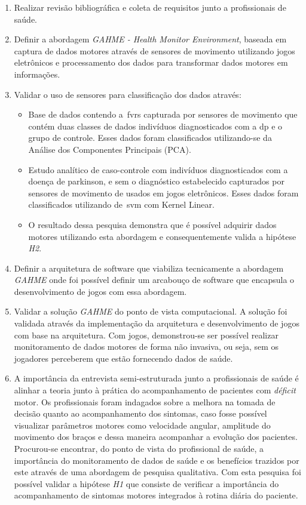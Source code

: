 \begin{enumerate}

\item{Realizar revisão bibliográfica e coleta de requisitos junto a profissionais de saúde.}

\item{Definir a abordagem \textit{GAHME - Health Monitor Environment}, baseada em captura de dados motores através de sensores de movimento utilizando jogos eletrônicos e processamento dos dados para transformar dados motores em informações.}

\item{Validar o uso de sensores para classificação dos dados através:} 
	\begin{itemize}
		\item Base de dados contendo a~\ac{fvrs} capturada por sensores de movimento que contém duas classes de dados indivíduos diagnosticados com a \ac{dp} e o grupo de controle. Esses dados foram classificados utilizando-se da Análise dos Componentes Principais (PCA).
		\item Estudo analítico de caso-controle com indivíduos diagnosticados com a doença de parkinson, e sem o diagnóstico estabelecido capturados por sensores de movimento de usados em jogos eletrônicos. Esses dados foram classificados utilizando de~\ac{svm} com Kernel Linear.
		\item O resultado dessa pesquisa demonstra que é possível adquirir dados motores utilizando esta abordagem e consequentemente valida a hipótese \textit{H2}.
	\end{itemize}
\item{Definir a arquitetura de software que viabiliza tecnicamente a abordagem \textit{GAHME} onde foi possível definir um arcabouço de software que encapsula o desenvolvimento de jogos com essa abordagem.}

\item{Validar a solução \textit{GAHME} do ponto de vista computacional. A solução foi validada através da implementação da arquitetura e desenvolvimento de jogos com base na arquitetura. Com jogos, demonstrou-se ser possível realizar monitoramento de dados motores de forma não invasiva, ou seja, sem os jogadores perceberem que estão fornecendo dados de saúde.}

\item{A importância da entrevista semi-estruturada junto a profissionais de saúde é alinhar a teoria junto à prática do acompanhamento de pacientes com \textit{déficit} motor.  Os profissionais foram indagados sobre a melhora na tomada de decisão quanto ao acompanhamento dos sintomas, caso fosse possível visualizar parâmetros motores como velocidade angular, amplitude do movimento dos braços e dessa maneira acompanhar a evolução dos pacientes. Procurou-se encontrar, do ponto de vista do profissional de saúde, a importância do monitoramento de dados de saúde e os benefícios trazidos por este através de uma abordagem de pesquisa qualitativa. Com esta pesquisa foi possível validar a hipótese \textit{H1} que consiste de verificar a importância do acompanhamento de sintomas motores integrados à rotina diária do paciente.}
    

\end{enumerate}
